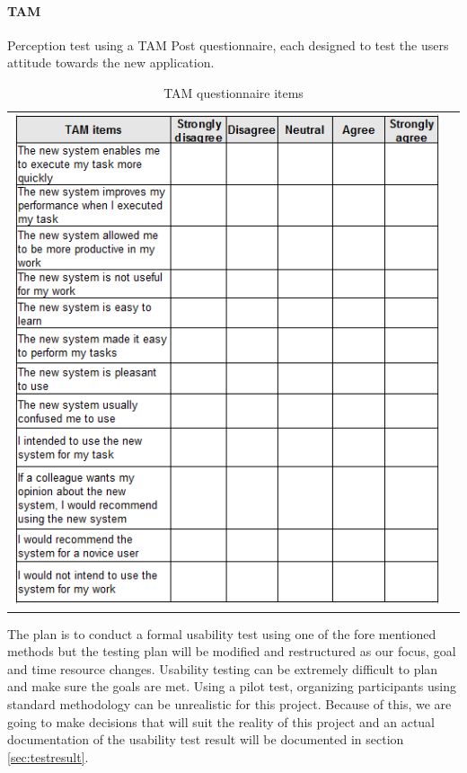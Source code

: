 \paragraph{TAM}
Perception test using a TAM Post questionnaire\cite{tam:doc4, tam:doc6}, each designed to test the users attitude towards the new application.
    \begin{table}[!htb]
        \caption{TAM questionnaire items}
        \centering
        \begin{tabular}{cc}
        \includegraphics[scale=0.97]{reqspec/tamtable.png}
        \end{tabular}
        \label{tab:tam}
    \end{table}

The plan is to conduct a formal usability test using one of the fore mentioned methods  but the testing plan will be modified and restructured as our focus, goal and time resource changes. Usability testing can be extremely difficult to plan and make sure the goals are met. Using a pilot test, organizing participants using standard methodology can be unrealistic for this  project. Because of this, we are going to make decisions that will suit the reality of this project and an actual documentation of the usability test result will be documented in section \ref{sec:testresult}.
\newpage

